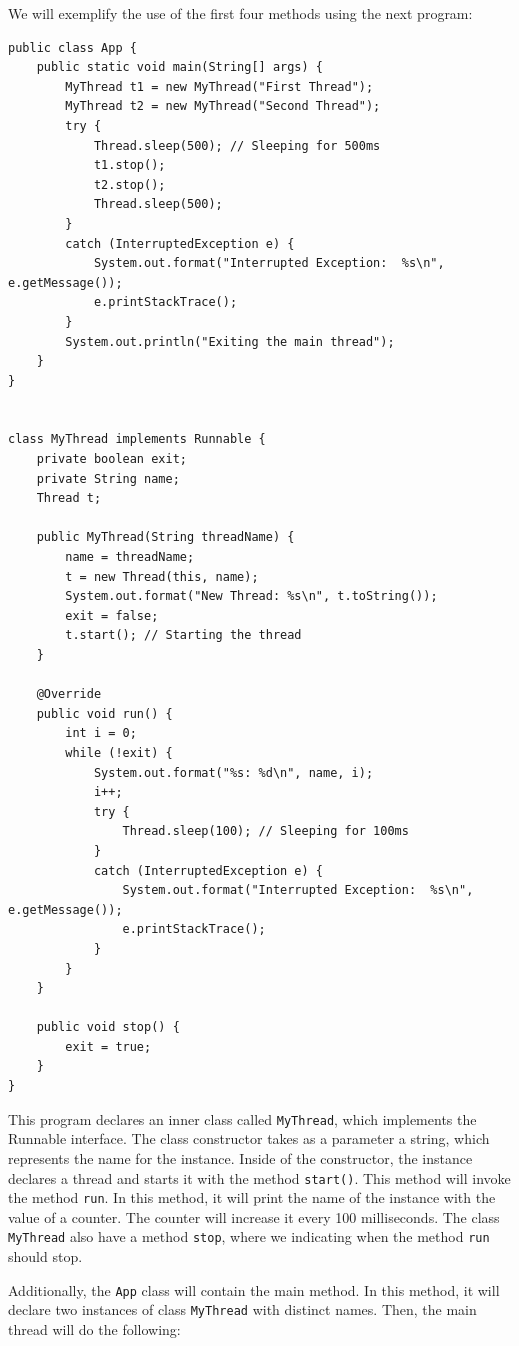 \documentclass[openany, a4paper]{book}
\theoremstyle{break}
\theoremstyle{example}
\theoremstyle{note}
\theoremstyle{break}
\theoremstyle{exercise}
\begin{document}
We will exemplify the use of the first four methods using the next program:

\begin{verbatim}
public class App {
    public static void main(String[] args) {
        MyThread t1 = new MyThread("First Thread");
        MyThread t2 = new MyThread("Second Thread");
        try {
            Thread.sleep(500); // Sleeping for 500ms
            t1.stop();
            t2.stop();
            Thread.sleep(500);
        }
        catch (InterruptedException e) {
            System.out.format("Interrupted Exception:  %s\n", e.getMessage());
            e.printStackTrace();
        }
        System.out.println("Exiting the main thread");
    }
}


class MyThread implements Runnable {
    private boolean exit;
    private String name;
    Thread t;

    public MyThread(String threadName) {
        name = threadName;
        t = new Thread(this, name);
        System.out.format("New Thread: %s\n", t.toString());
        exit = false;
        t.start(); // Starting the thread
    }

    @Override
    public void run() {
        int i = 0;
        while (!exit) {
            System.out.format("%s: %d\n", name, i);
            i++;
            try {
                Thread.sleep(100); // Sleeping for 100ms
            }
            catch (InterruptedException e) {
                System.out.format("Interrupted Exception:  %s\n", e.getMessage());
                e.printStackTrace();
            }
        }
    }

    public void stop() {
        exit = true;
    }
}
\end{verbatim}

This program declares an inner class called \texttt{MyThread}, which implements the
Runnable interface. The class constructor takes as a parameter a string,
which represents the name for the instance. Inside of the constructor, the
instance declares a thread and starts it with the method \texttt{start()}. This
method will invoke the method \texttt{run}. In this method, it will print the name of
the instance with the value of a counter. The counter will increase it every
100 milliseconds. The class \texttt{MyThread} also have a method \texttt{stop}, where we
indicating when the method \texttt{run} should stop.

Additionally, the \texttt{App} class will contain the main method. In this method, it
will declare two instances of class \texttt{MyThread} with distinct names. Then, the
main thread will do the following:
\end{document}
